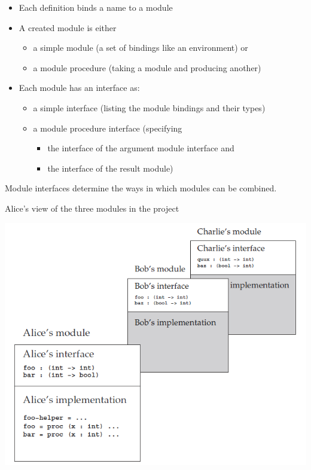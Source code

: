 \documentclass{article}
\begin{document}
\begin{huge}
\begin{itemize}
\item Each definition binds a name to a module
\item A created module is either 
\begin{itemize}
\item a simple module (a set of bindings like an environment) or
\item a module procedure (taking a module and producing another)
\end{itemize}
\item Each module has an interface as:
\begin{itemize}
\item a simple interface (listing the module bindings and their types)
\item a module procedure interface (specifying 
\begin{itemize}
\item the interface of the argument module interface and 
\item the interface of the result module)
\end{itemize}
\end{itemize}
\end{itemize}

Module interfaces determine the ways in which modules can be combined.


Alice's view of the three modules in the project
\begin{center}
\includegraphics[width=0.7\linewidth]{eopl3_figure8_1}
\end{center}



\end{huge}
\end{document}
